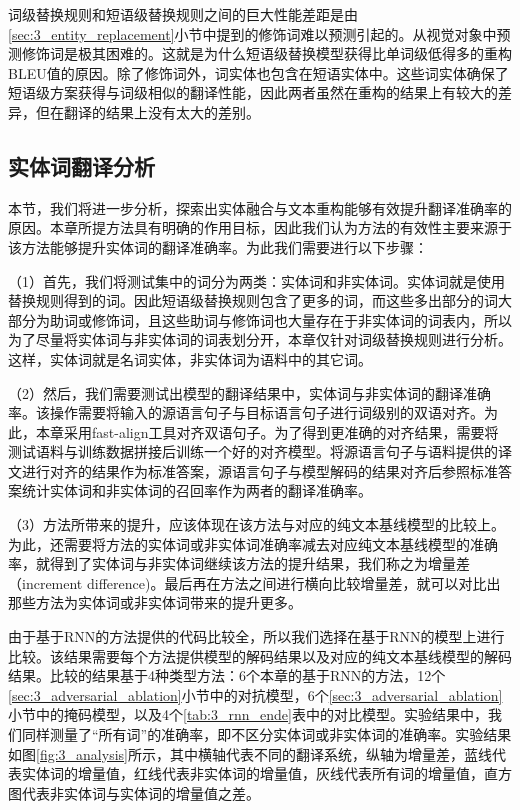 词级替换规则和短语级替换规则之间的巨大性能差距是由\ref{sec:3_entity_replacement}小节中提到的修饰词难以预测引起的。从视觉对象中预测修饰词是极其困难的。这就是为什么短语级替换模型获得比单词级低得多的重构BLEU值的原因。除了修饰词外，词实体也包含在短语实体中。这些词实体确保了短语级方案获得与词级相似的翻译性能，因此两者虽然在重构的结果上有较大的差异，但在翻译的结果上没有太大的差别。

\subsection{实体词翻译分析}
本节，我们将进一步分析，探索出实体融合与文本重构能够有效提升翻译准确率的原因。本章所提方法具有明确的作用目标，因此我们认为方法的有效性主要来源于该方法能够提升实体词的翻译准确率。为此我们需要进行以下步骤：

（1）首先，我们将测试集中的词分为两类：实体词和非实体词。实体词就是使用替换规则得到的词。因此短语级替换规则包含了更多的词，而这些多出部分的词大部分为助词或修饰词，且这些助词与修饰词也大量存在于非实体词的词表内，所以为了尽量将实体词与非实体词的词表划分开，本章仅针对词级替换规则进行分析。这样，实体词就是名词实体，非实体词为语料中的其它词。

（2）然后，我们需要测试出模型的翻译结果中，实体词与非实体词的翻译准确率。该操作需要将输入的源语言句子与目标语言句子进行词级别的双语对齐。为此，本章采用fast-align\cite{45_dyer-etal-2013-simple}工具对齐双语句子。为了得到更准确的对齐结果，需要将测试语料与训练数据拼接后训练一个好的对齐模型。将源语言句子与语料提供的译文进行对齐的结果作为标准答案，源语言句子与模型解码的结果对齐后参照标准答案统计实体词和非实体词的召回率作为两者的翻译准确率。

（3）方法所带来的提升，应该体现在该方法与对应的纯文本基线模型的比较上。为此，还需要将方法的实体词或非实体词准确率减去对应纯文本基线模型的准确率，就得到了实体词与非实体词继续该方法的提升结果，我们称之为增量差（increment difference)。最后再在方法之间进行横向比较增量差，就可以对比出那些方法为实体词或非实体词带来的提升更多。


由于基于RNN的方法提供的代码比较全，所以我们选择在基于RNN的模型上进行比较。该结果需要每个方法提供模型的解码结果以及对应的纯文本基线模型的解码结果。比较的结果基于4种类型方法：6个本章的基于RNN的方法，12个\ref{sec:3_adversarial_ablation}小节中的对抗模型，6个\ref{sec:3_adversarial_ablation}小节中的掩码模型，以及4个\ref{tab:3_rnn_ende}表中的对比模型。实验结果中，我们同样测量了“所有词”的准确率，即不区分实体词或非实体词的准确率。实验结果如图\ref{fig:3_analysis}所示，其中横轴代表不同的翻译系统，纵轴为增量差，蓝线代表实体词的增量值，红线代表非实体词的增量值，灰线代表所有词的增量值，直方图代表非实体词与实体词的增量值之差。

